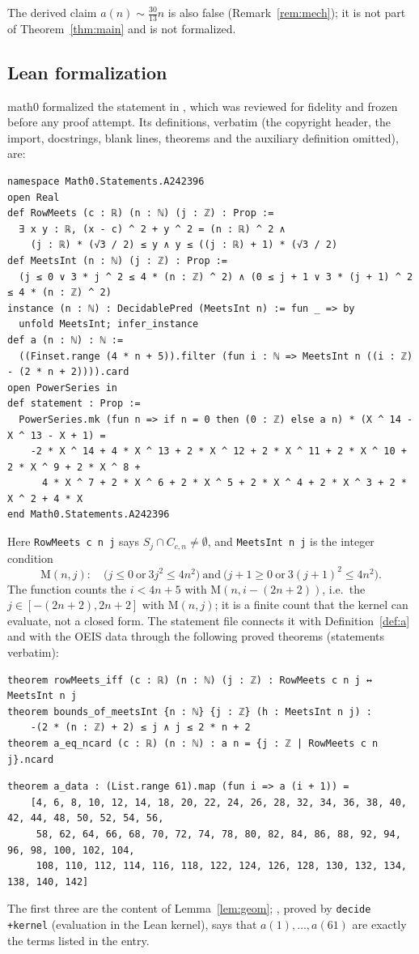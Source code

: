 \documentclass[11pt]{amsart}
\theoremstyle{plain}
\theoremstyle{definition}
\newcommand{\MI}{\mathrm{M}}
\begin{document}
The derived claim $a(n)\sim\frac{30}{13}n$ is also false (Remark~\ref{rem:mech}); it is not part of Theorem~\ref{thm:main} and is not formalized.

\subsection*{Lean formalization}
math0 formalized the statement in , which was reviewed for fidelity and frozen before any proof attempt. Its definitions, verbatim (the copyright header, the import, docstrings, blank lines, theorems and the auxiliary definition  omitted), are:
\begin{lstlisting}
namespace Math0.Statements.A242396
open Real
def RowMeets (c : ℝ) (n : ℕ) (j : ℤ) : Prop :=
  ∃ x y : ℝ, (x - c) ^ 2 + y ^ 2 = (n : ℝ) ^ 2 ∧
    (j : ℝ) * (√3 / 2) ≤ y ∧ y ≤ ((j : ℝ) + 1) * (√3 / 2)
def MeetsInt (n : ℕ) (j : ℤ) : Prop :=
  (j ≤ 0 ∨ 3 * j ^ 2 ≤ 4 * (n : ℤ) ^ 2) ∧ (0 ≤ j + 1 ∨ 3 * (j + 1) ^ 2 ≤ 4 * (n : ℤ) ^ 2)
instance (n : ℕ) : DecidablePred (MeetsInt n) := fun _ => by
  unfold MeetsInt; infer_instance
def a (n : ℕ) : ℕ :=
  ((Finset.range (4 * n + 5)).filter (fun i : ℕ => MeetsInt n ((i : ℤ) - (2 * n + 2)))).card
open PowerSeries in
def statement : Prop :=
  PowerSeries.mk (fun n => if n = 0 then (0 : ℤ) else a n) * (X ^ 14 - X ^ 13 - X + 1) =
    -2 * X ^ 14 + 4 * X ^ 13 + 2 * X ^ 12 + 2 * X ^ 11 + 2 * X ^ 10 + 2 * X ^ 9 + 2 * X ^ 8 +
      4 * X ^ 7 + 2 * X ^ 6 + 2 * X ^ 5 + 2 * X ^ 4 + 2 * X ^ 3 + 2 * X ^ 2 + 4 * X
end Math0.Statements.A242396
\end{lstlisting}
Here \texttt{RowMeets c n j} says $S_j\cap C_{c,n}\ne\emptyset$, and \texttt{MeetsInt n j} is the integer condition
\[
  \MI(n,j):\quad \bigl(j\le0\ \text{or}\ 3j^2\le4n^2\bigr)\ \text{and}\ \bigl(j+1\ge0\ \text{or}\ 3(j+1)^2\le4n^2\bigr).
\]
The function  counts the $i<4n+5$ with $\MI(n,i-(2n+2))$, i.e.\ the $j\in[-(2n+2),2n+2]$ with $\MI(n,j)$; it is a finite count that the kernel can evaluate, not a closed form. The statement file connects it with Definition~\ref{def:a} and with the OEIS data through the following proved theorems (statements verbatim):
\begin{lstlisting}
theorem rowMeets_iff (c : ℝ) (n : ℕ) (j : ℤ) : RowMeets c n j ↔ MeetsInt n j
theorem bounds_of_meetsInt {n : ℕ} {j : ℤ} (h : MeetsInt n j) :
    -(2 * (n : ℤ) + 2) ≤ j ∧ j ≤ 2 * n + 2
theorem a_eq_ncard (c : ℝ) (n : ℕ) : a n = {j : ℤ | RowMeets c n j}.ncard
\end{lstlisting}
\begin{lstlisting}[basicstyle=\ttfamily\scriptsize]
theorem a_data : (List.range 61).map (fun i => a (i + 1)) =
    [4, 6, 8, 10, 12, 14, 18, 20, 22, 24, 26, 28, 32, 34, 36, 38, 40, 42, 44, 48, 50, 52, 54, 56,
     58, 62, 64, 66, 68, 70, 72, 74, 78, 80, 82, 84, 86, 88, 92, 94, 96, 98, 100, 102, 104,
     108, 110, 112, 114, 116, 118, 122, 124, 126, 128, 130, 132, 134, 138, 140, 142]
\end{lstlisting}
The first three are the content of Lemma~\ref{lem:geom}; , proved by \texttt{decide +kernel} (evaluation in the Lean kernel), says that $a(1),\dots,a(61)$ are exactly the terms listed in the entry.
\end{document}
